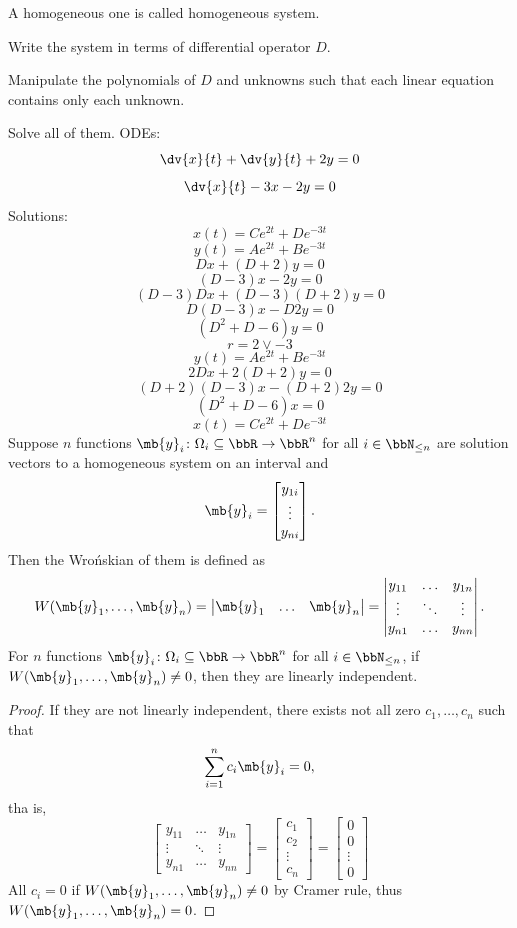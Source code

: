 \documentclass[a4paper,12pt]{report}
\begin{document}
A homogeneous one is called homogeneous system.
\ben
\item Write the system in terms of differential operator $D$.
\item Manipulate the polynomials of $D$ and unknowns such that each linear equation contains only each unknown.
\item Solve all of them.
\een
{}
ODEs:
\[\dv{x}{t}+\dv{y}{t}+2y=0\]
\[\dv{x}{t}-3x-2y=0\]
Solutions:
\[x(t)=Ce^{2t}+De^{-3t}\]
\[y(t)=Ae^{2t}+Be^{-3t}\]
\bpr
\[Dx+(D+2)y=0\]
\[(D-3)x-2y=0\]
\[(D-3)Dx+(D-3)(D+2)y=0\]
\[D(D-3)x-D2y=0\]
\[(D^2+D-6)y=0\]
\[r=2\lor -3\]
\[y(t)=Ae^{2t}+Be^{-3t}\]
\[2Dx+2(D+2)y=0\]
\[(D+2)(D-3)x-(D+2)2y=0\]
\[(D^2+D-6)x=0\]
\[x(t)=Ce^{2t}+De^{-3t}\]
\epr
{}
Suppose $n$ functions $\mb{y}_i\colon\Omega_i\subseteq\bbR\to\bbR^n$ for all $i\in\bbN_{\le n}$ are solution vectors to a homogeneous system on an interval and
\[\mb{y}_i=\begin{bmatrix}y_{1i}\\\vdots\\y_{ni}\end{bmatrix}.\]
Then the Wrońskian of them is defined as
\[W(\mb{y}_1,\ldots,\mb{y}_n)=\begin{vmatrix}\mb{y}_1&\ldots&\mb{y}_n\end{vmatrix}=\begin{vmatrix}y_{11}&\ldots&y_{1n}\\\vdots&\ddots&\vdots\\y_{n1}&\ldots&y_{nn}\end{vmatrix}.\]
For $n$ functions $\mb{y}_i\colon\Omega_i\subseteq\bbR\to\bbR^n$ for all $i\in\bbN_{\le n}$, if $W(\mb{y}_1,\ldots,\mb{y}_n)\ne0$, then they are linearly independent.
\begin{proof}
If they are not linearly independent, there exists not all zero $c_1,\ldots,c_n$ such that
\[\sum_{i=1}^nc_i\mb{y}_i=0,\]
tha is,
\[\begin{bmatrix}y_{11}&\ldots&y_{1n}\\\vdots&\ddots&\vdots\\y_{n1}&\ldots&y_{nn}\end{bmatrix}=\begin{bmatrix}c_1\\c_2\\\vdots\\c_n\end{bmatrix}=\begin{bmatrix}0\\0\\\vdots\\0\end{bmatrix}\]
All $c_i=0$ if $W(\mb{y}_1,\ldots,\mb{y}_n)\ne 0$ by Cramer rule, thus $W(\mb{y}_1,\ldots,\mb{y}_n)=0$.
\end{proof}
\end{document}
